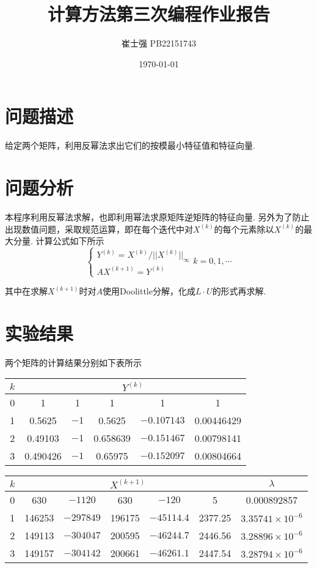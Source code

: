 \documentclass[UTF8]{ctexart}
\title{计算方法第三次编程作业报告}
\author{崔士强 PB22151743}
\date{\today}
\begin{document}
\maketitle
\section{问题描述}
给定两个矩阵，利用反幂法求出它们的按模最小特征值和特征向量.

\section{问题分析}
本程序利用反幂法求解，也即利用幂法求原矩阵逆矩阵的特征向量. 
另外为了防止出现数值问题，采取规范运算，即在每个迭代中对$X^{(k)}$的每个元素除以$X^{(k)}$的最大分量. 
计算公式如下所示
\begin{equation}
  \begin{cases}
    Y^{(k)} = X^{(k)}/||X^{(k)}||_\infty \\
    AX^{(k+1)} = Y^{(k)}
  \end{cases}
  k = 0, 1, \cdots
\end{equation}

其中在求解$X^{(k+1)}$时对$A$使用Doolittle分解，化成$L \cdot U$的形式再求解.

\section{实验结果}
两个矩阵的计算结果分别如下表所示
\begin{table}[H]
  \centering
  \begin{tabular}{c|ccccc}
    \hline\hline
    $k$ & \multicolumn{5}{c}{$Y^{(k)}$} \\
    \hline
    0 & 1 & 1 & 1 & 1 & 1 \\
    1 & 0.5625 & $-1$ & 0.5625 & $-0.107143$ & 0.00446429 \\
    2 & 0.49103 & $-1$ & 0.658639 & $-0.151467$ & 0.00798141 \\
    3 & 0.490426 & $-1$ & 0.65975 & $-0.152097$ & 0.00804664 \\
    \hline\hline 
  \end{tabular}
\end{table}
\begin{table}[H]
  \centering
  \begin{tabular}{c|ccccc|c}
    \hline\hline
    $k$ & \multicolumn{5}{c|}{$X^{(k+1)}$} & $\lambda$\\
    \hline
    0 & 630 & $-1120$ & 630 & $-120$ & 5 & 0.000892857 \\
    1 & 146253 & $-297849$ & 196175 & $-45114.4$ & 2377.25 & $3.35741\times 10^{-6}$ \\
    2 & 149113 & $-304047$ & 200595 & $-46244.7$ & 2446.56 & $3.28896\times 10^{-6}$ \\
    3 & 149157 & $-304142$ & 200661 & $-46261.1$ & 2447.54 & $3.28794\times 10^{-6}$ \\
    \hline\hline 
  \end{tabular}
\end{table}
\end{document}
